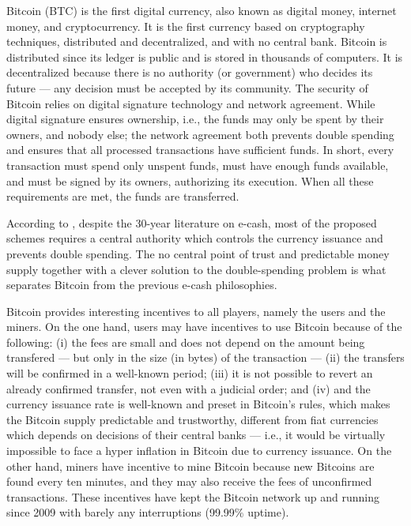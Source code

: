 Bitcoin (BTC) is the first digital currency, also known as digital money, internet money, and cryptocurrency. It is the first currency based on cryptography techniques, distributed and decentralized, and with no central bank. Bitcoin is distributed since its ledger is public and is stored in thousands of computers. It is decentralized because there is no authority (or government) who decides its future --- any decision must be accepted by its community. The security of Bitcoin relies on digital signature technology and network agreement. While digital signature ensures ownership, i.e., the funds may only be spent by their owners, and nobody else; the network agreement both prevents double spending and ensures that all processed transactions have sufficient funds. In short, every transaction must spend only unspent funds, must have enough funds available, and must be signed by its owners, authorizing its execution. When all these requirements are met, the funds are transferred.

According to \citet{barber2012bitter}, despite the 30-year literature on e-cash, most of the proposed schemes requires a central authority which controls the currency issuance and prevents double spending. The no central point of trust and predictable money supply together with a clever solution to the double-spending problem is what separates Bitcoin from the previous e-cash philosophies. %

Bitcoin provides interesting incentives to all players, namely the users and the miners. On the one hand, users may have incentives to use Bitcoin because of the following: (i) the fees are small and does not depend on the amount being transfered --- but only in the size (in bytes) of the transaction --- (ii) the transfers will be confirmed in a well-known period; (iii) it is not possible to revert an already confirmed transfer, not even with a judicial order; and (iv) and the currency issuance rate is well-known and preset in Bitcoin's rules, which makes the Bitcoin supply predictable and trustworthy, different from fiat currencies which depends on decisions of their central banks --- i.e., it would be virtually impossible to face a hyper inflation in Bitcoin due to currency issuance. On the other hand, miners have incentive to mine Bitcoin because new Bitcoins are found every ten minutes, and they may also receive the fees of unconfirmed transactions. These incentives have kept the Bitcoin network up and running since 2009 with barely any interruptions (99.99\% uptime).


